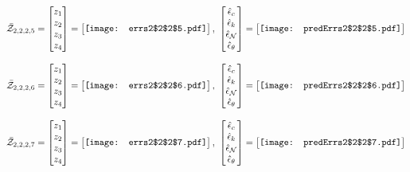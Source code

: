 \documentclass[12pt]{article}
\begin{document}
\begin{gather*}
\bar{\mathcal{Z}}_{2,2,2,5}=\begin{bmatrix}
z_1\\
z_2\\
z_3\\
z_4
 \end{bmatrix}= \begin{bmatrix}
\vcenter{\hbox{\texttt{[image: errs2\$2\$2\$5.pdf]}}}
 \end{bmatrix},\,\, \begin{bmatrix}
\hat{\epsilon}_c\\\hat{\epsilon}_k\\\hat{\epsilon}_\mathcal{N}\\\hat{\epsilon}_\theta
 \end{bmatrix}=\begin{bmatrix}
\vcenter{\hbox{\texttt{[image: predErrs2\$2\$2\$5.pdf]}}}
 \end{bmatrix}
\end{gather*}


\begin{gather*}
\bar{\mathcal{Z}}_{2,2,2,6}=\begin{bmatrix}
z_1\\
z_2\\
z_3\\
z_4
 \end{bmatrix}= \begin{bmatrix}
\vcenter{\hbox{\texttt{[image: errs2\$2\$2\$6.pdf]}}}
 \end{bmatrix},\,\, \begin{bmatrix}
\hat{\epsilon}_c\\\hat{\epsilon}_k\\\hat{\epsilon}_\mathcal{N}\\\hat{\epsilon}_\theta
 \end{bmatrix}=\begin{bmatrix}
\vcenter{\hbox{\texttt{[image: predErrs2\$2\$2\$6.pdf]}}}
 \end{bmatrix}
\end{gather*}


\begin{gather*}
\bar{\mathcal{Z}}_{2,2,2,7}=\begin{bmatrix}
z_1\\
z_2\\
z_3\\
z_4
 \end{bmatrix}= \begin{bmatrix}
\vcenter{\hbox{\texttt{[image: errs2\$2\$2\$7.pdf]}}}
 \end{bmatrix},\,\, \begin{bmatrix}
\hat{\epsilon}_c\\\hat{\epsilon}_k\\\hat{\epsilon}_\mathcal{N}\\\hat{\epsilon}_\theta
 \end{bmatrix}=\begin{bmatrix}
\vcenter{\hbox{\texttt{[image: predErrs2\$2\$2\$7.pdf]}}}
 \end{bmatrix}
\end{gather*}
\end{document}

